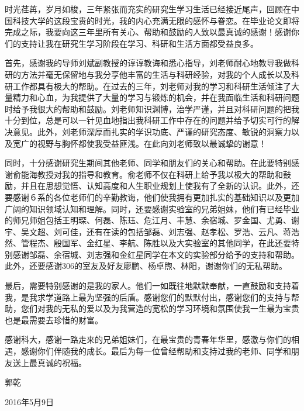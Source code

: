 \begin{acknowledgements}
\par 时光荏苒，岁月如梭，三年紧张而充实的研究生学习生活已经接近尾声，回顾在中国科技大学的这段宝贵的时光，我的内心充满无限的感怀与眷恋。在毕业论文即将完成之际，我要向这三年里所有关心、帮助和鼓励的人致以最真诚的感谢！感谢你们的支持让我在研究生学习阶段在学习、科研和生活方面都受益良多。
\par 首先，感谢我的导师刘斌副教授的谆谆教诲和悉心指导，刘老师耐心地教导我做科研的方法并毫无保留地与我分享他丰富的生活与科研经验，对我的个人成长以及科研工作都具有极大的帮助。在过去的三年，刘老师对我的学习和科研生活倾注了大量精力和心血，为我提供了大量的学习与锻炼的机会，并在我面临生活和科研问题时给予我很大的帮助和鼓励。刘老师知识渊博，治学严谨，并且对科研问题的把我十分到位，总是可以一针见血地指出我科研工作中存在的问题并给予切实可行的解决意见。此外，刘老师深厚而扎实的学识功底、严谨的研究态度、敏锐的洞察力以及宽广的视野与胸怀都使我受益匪浅。在此向刘老师致以最诚挚的谢意！
\par 同时，十分感谢研究生期间其他老师、同学和朋友们的关心和帮助。在此要特别感谢俞能海教授对我的指导和教育。俞老师不仅在科研上给予我以极大的帮助和鼓励，并且在思想觉悟、认知高度和人生职业规划上使我有了全新的认识。此外，还要感谢６系的各位老师们的辛勤教诲，他们使我拥有更加扎实的基础知识以及更加广阔的知识领域认知和理解。同时，还要感谢实验室的兄弟姐妹，他们有已经毕业的师兄师姐包括王明琛、何磊、陈珏、危江月、丰慧、余宿城、罗金国、尤勇、谢宇、吴文超、刘可佳，还有在读的包括邹磊、刘志强、赵孝松、罗浩、云凡、蒋浩然、管程杰、殷国军、金红星、李航、陈胜以及大实验室的其他同学，在此还要特别感谢邹磊、余宿城、刘志强和金红星同学在本文的实验部分给予的支持和帮助。此外，还要感谢306的室友及好友廖鹏、杨卓煦、林阳，谢谢你们的无私帮助。
\par 最后，需要特别感谢的是我的家人。他们一如既往地默默奉献，一直鼓励和支持着我，是我求学道路上最为坚强的后盾。感谢您们的默默付出，感谢您们的支持与帮助，您们对我的无私的爱以及为我营造的宽松的学习环境和氛围使我一生最为宝贵也是最需要去珍惜的财富。
\par 感谢科大，感谢一路走来的兄弟姐妹们，在最宝贵的青春年华里，感激与你们的相遇，感谢你们伴随我的成长。最后为每一位曾经帮助和支持过我的老师、同学和朋友送上最真诚的祝福。
\begin{flushright}
\par 郭乾   \qquad
\par 2016年5月9日
\end{flushright}
\end{acknowledgements}
